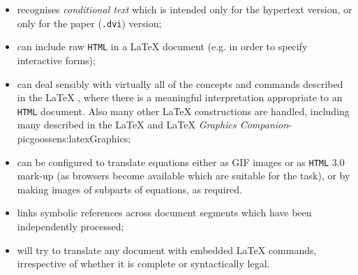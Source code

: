 \begin{itemize}
%
\item 
recognises \emph{conditional text}  which is intended only for
the hypertext version, or only for the paper (\texttt{.dvi}) version;\par
%
%
%
\item 
can include raw \texttt{HTML} in a \LaTeX{}  document 
(e.g. in order to specify interactive forms);

\label{hypcites}%
%
%
\item 
can deal sensibly with 
%
virtually all of the concepts and commands described in
the \LaTeX{} , 
where there is a meaningful interpretation appropriate to
an \texttt{HTML} document.
Also many other \LaTeX{} constructions are handled, including many described in the 
\LaTeX{} 
and \LaTeX{} %
{\textit{Graphics Companion}}{\Xy-pic}{goossens:latexGraphics};

%
%
%
%
%
%
\item 
can be configured to translate equations either
as GIF images or as \texttt{HTML} 3.0 mark-up
(as browsers become available which are suitable for the task),
or by making images of subparts of equations, as required.

%
%
\item 
links symbolic references across document segments which have been
independently processed;%

%
%
\item 
will try to translate any document with embedded \LaTeX{} commands, 
irrespective of whether it is complete or syntactically legal.

\end{itemize}


